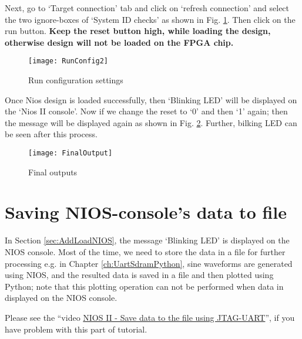 Next, go to `Target connection' tab and click on `refresh connection' and select the two ignore-boxes of `System ID checks' as shown in Fig. \ref{fig:2run}. Then click on the run button. \textbf{Keep the reset button high, while loading the design, otherwise design will not be loaded on the FPGA chip.}

\begin{figure}[!h]
	\centering
	\texttt{[image: RunConfig2]}
	\caption{Run configuration settings}
	\label{fig:2run}
\end{figure}

Once Nios design is loaded successfully, then `Blinking LED' will be displayed on the `Nios II console'. Now if we change the reset to `0' and then `1' again; then the message will be displayed again as shown in Fig. \ref{fig:FinalOutput}. Further, bilking LED can be seen after this process. 

\begin{figure}[!h]
	\centering
	\texttt{[image: FinalOutput]}
	\caption{Final outputs}
	\label{fig:FinalOutput}
\end{figure}

\section{Saving NIOS-console's data to file}
In Section \ref{sec:AddLoadNIOS}, the message `Blinking LED' is displayed on the NIOS console. Most of the time, we need to store the data in a file for further processing e.g. in Chapter \ref{ch:UartSdramPython}, sine waveforms are generated using NIOS, and the resulted data is saved in a file and then plotted using Python; note that this plotting operation can not be performed when data in displayed on the NIOS console. 

Please see the ``video \href{https://www.youtube.com/playlist?list=PLpqu8JfoNKiNJpFvKTeBlI-LMzc2TAlRM}{NIOS II - Save data to the file using JTAG-UART}'', if you have problem with this part of tutorial. 

